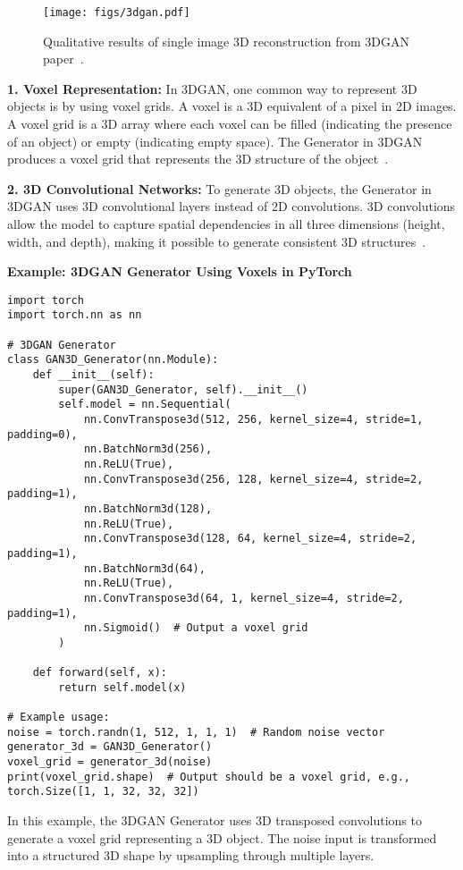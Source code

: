 \begin{figure}[htbp]
    \centering
    \texttt{[image: figs/3dgan.pdf]}
    \caption{Qualitative results of single image 3D reconstruction from 3DGAN paper~\cite{wu2016learning}.}
\end{figure}

\textbf{1. Voxel Representation:}  
In 3DGAN, one common way to represent 3D objects is by using voxel grids. A voxel is a 3D equivalent of a pixel in 2D images. A voxel grid is a 3D array where each voxel can be filled (indicating the presence of an object) or empty (indicating empty space). The Generator in 3DGAN produces a voxel grid that represents the 3D structure of the object~\cite{liu2020neural}.

\textbf{2. 3D Convolutional Networks:}  
To generate 3D objects, the Generator in 3DGAN uses 3D convolutional layers instead of 2D convolutions. 3D convolutions allow the model to capture spatial dependencies in all three dimensions (height, width, and depth), making it possible to generate consistent 3D structures~\cite{wu2016learning}.

\textbf{Example: 3DGAN Generator Using Voxels in PyTorch}

\begin{lstlisting}[style=python]
import torch
import torch.nn as nn

# 3DGAN Generator
class GAN3D_Generator(nn.Module):
    def __init__(self):
        super(GAN3D_Generator, self).__init__()
        self.model = nn.Sequential(
            nn.ConvTranspose3d(512, 256, kernel_size=4, stride=1, padding=0),
            nn.BatchNorm3d(256),
            nn.ReLU(True),
            nn.ConvTranspose3d(256, 128, kernel_size=4, stride=2, padding=1),
            nn.BatchNorm3d(128),
            nn.ReLU(True),
            nn.ConvTranspose3d(128, 64, kernel_size=4, stride=2, padding=1),
            nn.BatchNorm3d(64),
            nn.ReLU(True),
            nn.ConvTranspose3d(64, 1, kernel_size=4, stride=2, padding=1),
            nn.Sigmoid()  # Output a voxel grid
        )

    def forward(self, x):
        return self.model(x)

# Example usage:
noise = torch.randn(1, 512, 1, 1, 1)  # Random noise vector
generator_3d = GAN3D_Generator()
voxel_grid = generator_3d(noise)
print(voxel_grid.shape)  # Output should be a voxel grid, e.g., torch.Size([1, 1, 32, 32, 32])
\end{lstlisting}

In this example, the 3DGAN Generator uses 3D transposed convolutions to generate a voxel grid representing a 3D object. The noise input is transformed into a structured 3D shape by upsampling through multiple layers.


